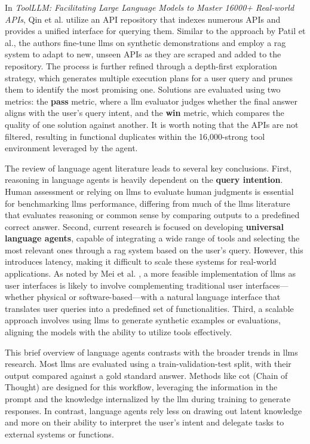 In \textit{ToolLLM: Facilitating Large Language Models to Master 16000+ Real-world APIs}, Qin et al. \cite{qin2023toolllmfacilitatinglargelanguage} utilize an API repository that indexes numerous APIs and provides a unified interface for querying them. Similar to the approach by Patil et al., the authors fine-tune \glspl{llm} on synthetic demonstrations and employ a \gls{rag} system to adapt to new, unseen APIs as they are scraped and added to the repository. The process is further refined through a depth-first exploration strategy, which generates multiple execution plans for a user query and prunes them to identify the most promising one. Solutions are evaluated using two metrics: the \textbf{pass} metric, where a \gls{llm} evaluator judges whether the final answer aligns with the user's query intent, and the \textbf{win} metric, which compares the quality of one solution against another. It is worth noting that the APIs are not filtered, resulting in functional duplicates within the 16,000-strong tool environment leveraged by the agent.

\pskip

The review of language agent literature leads to several key conclusions. First, reasoning in language agents is heavily dependent on the \textbf{query intention}. Human assessment or relying on \glspl{llm} to evaluate human judgments \cite{zheng2023judgingllmasajudgemtbenchchatbot} is essential for benchmarking \glspl{llm} performance, differing from much of the \glspl{llm} literature that evaluates reasoning or common sense by comparing outputs to a predefined correct answer. Second, current research is focused on developing \textbf{universal language agents}, capable of integrating a wide range of tools and selecting the most relevant ones through a \gls{rag} system based on the user's query. However, this introduces latency, making it difficult to scale these systems for real-world applications. As noted by Mei et al. \cite{aiasos}, a more feasible implementation of \glspl{llm} as user interfaces is likely to involve complementing traditional user interfaces—whether physical or software-based—with a natural language interface that translates user queries into a predefined set of functionalities. Third, a scalable approach involves using \glspl{llm} to generate synthetic examples or evaluations, aligning the models with the ability to utilize tools effectively.

\pskip

This brief overview of language agents contrasts with the broader trends in \glspl{llm} research. Most \glspl{llm} are evaluated using a train-validation-test split, with their output compared against a gold standard answer. Methods like \gls{cot} (Chain of Thought) are designed for this workflow, leveraging the information in the prompt and the knowledge internalized by the \gls{llm} during training to generate responses. In contrast, language agents rely less on drawing out latent knowledge and more on their ability to interpret the user's intent and delegate tasks to external systems or functions.

